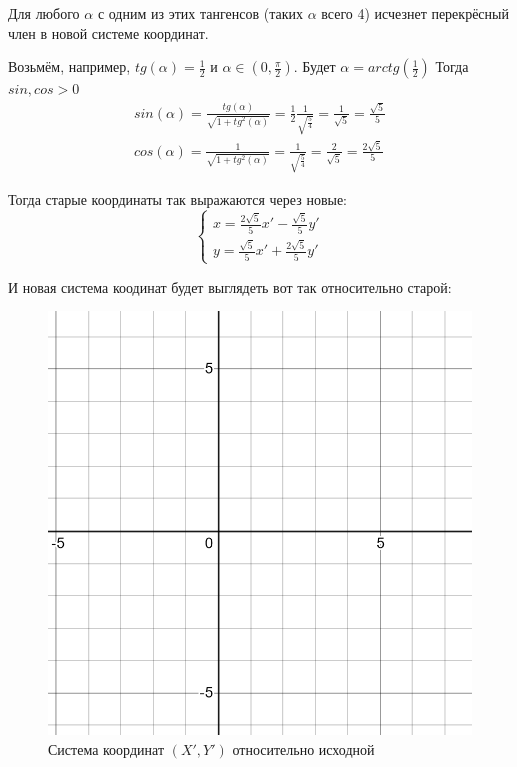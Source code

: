 \documentclass[12pt, a4paper]{article}
\begin{document}
    Для любого $\alpha$ с одним из этих тангенсов (таких $\alpha$ всего 4) исчезнет перекрёсный член в новой системе координат.

    Возьмём, например, $tg(\alpha) = \frac{1}{2}$ и $\alpha \in (0, \frac{\pi}{2})$.
    Будет $\alpha = arctg\left( \frac{1}{2} \right)$
    Тогда $sin, cos > 0$
    \begin{gather}
        sin(\alpha) = \frac{tg(\alpha)}{\sqrt{1 + tg^2(\alpha)}} = \frac{1}{2} \frac{1}{\sqrt{\frac{5}{4}}} = \frac{1}{\sqrt{5}} = \frac{\sqrt{5}}{5} \\
        cos(\alpha) = \frac{1}{\sqrt{1 + tg^2(\alpha)}} = \frac{1}{\sqrt{\frac{5}{4}}} = \frac{2}{\sqrt{5}} = \frac{2\sqrt{5}}{5}
    \end{gather}

    Тогда старые координаты так выражаются через новые:
    \begin{equation}
        \begin{cases}
            x = \frac{2\sqrt{5}}{5} x' - \frac{\sqrt{5}}{5} y' \\
            y = \frac{\sqrt{5}}{5} x' + \frac{2\sqrt{5}}{5} y'
        \end{cases}
    \end{equation}

    И новая система коодинат будет выглядеть вот так относительно старой:

    \begin{figure}[h!]
        \centering
        \includegraphics[width=\textwidth]{resources/1.7_grid_x'.png}
        \caption{Система координат $(X', Y')$ относительно исходной}
        \label{fig:grid_1}
    \end{figure}
    \FloatBarrier
    
\end{document}
